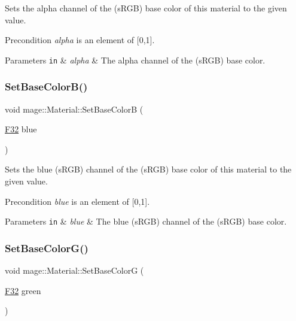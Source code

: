 Sets the alpha channel of the (s\+R\+GB) base color of this material to the given value.

\begin{DoxyPrecond}{Precondition}
{\itshape alpha} is an element of \mbox{[}0,1\mbox{]}. 
\end{DoxyPrecond}

\begin{DoxyParams}[1]{Parameters}
\mbox{\tt in}  & {\em alpha} & The alpha channel of the (s\+R\+GB) base color. \\
\hline
\end{DoxyParams}
\hypertarget{structmage_1_1_material_a703b29a7e0d31afe7781765ec6ea172e}{}\label{structmage_1_1_material_a703b29a7e0d31afe7781765ec6ea172e} 
\subsubsection{\texorpdfstring{Set\+Base\+Color\+B()}{SetBaseColorB()}}
{\footnotesize\ttfamily void mage\+::\+Material\+::\+Set\+Base\+ColorB (\begin{DoxyParamCaption}\item[{\hyperlink{namespacemage_aa97e833b45f06d60a0a9c4fc22ae02c0}{F32}}]{blue }\end{DoxyParamCaption})\hspace{0.3cm}{\ttfamily [noexcept]}}

Sets the blue (s\+R\+GB) channel of the (s\+R\+GB) base color of this material to the given value.

\begin{DoxyPrecond}{Precondition}
{\itshape blue} is an element of \mbox{[}0,1\mbox{]}. 
\end{DoxyPrecond}

\begin{DoxyParams}[1]{Parameters}
\mbox{\tt in}  & {\em blue} & The blue (s\+R\+GB) channel of the (s\+R\+GB) base color. \\
\hline
\end{DoxyParams}
\hypertarget{structmage_1_1_material_a5969ee99b74e884838e991374012dcb3}{}\label{structmage_1_1_material_a5969ee99b74e884838e991374012dcb3} 
\subsubsection{\texorpdfstring{Set\+Base\+Color\+G()}{SetBaseColorG()}}
{\footnotesize\ttfamily void mage\+::\+Material\+::\+Set\+Base\+ColorG (\begin{DoxyParamCaption}\item[{\hyperlink{namespacemage_aa97e833b45f06d60a0a9c4fc22ae02c0}{F32}}]{green }\end{DoxyParamCaption})\hspace{0.3cm}{\ttfamily [noexcept]}}

